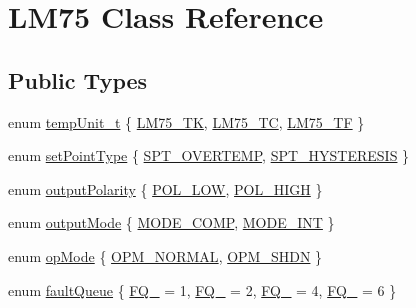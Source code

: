 \hypertarget{class_l_m75}{\section{L\-M75 Class Reference}
\label{class_l_m75}
}
\subsection*{Public Types}
\begin{DoxyCompactItemize}
\item 
enum \hyperlink{class_l_m75_a2a7ea6f324fe6d70e90dd76bac1d2f2d}{temp\-Unit\-\_\-t} \{ \hyperlink{class_l_m75_a2a7ea6f324fe6d70e90dd76bac1d2f2da547e55f7743275a163e43576c120477b}{L\-M75\-\_\-\-T\-K}, 
\hyperlink{class_l_m75_a2a7ea6f324fe6d70e90dd76bac1d2f2dac93d25e3d1bca073b3fb6c725de49ea1}{L\-M75\-\_\-\-T\-C}, 
\hyperlink{class_l_m75_a2a7ea6f324fe6d70e90dd76bac1d2f2da41c080b0ce5607f1767060ac24e4c522}{L\-M75\-\_\-\-T\-F}
 \}
\item 
enum \hyperlink{class_l_m75_ac49994df7bcf8aeda551af5b80559402}{set\-Point\-Type} \{ \hyperlink{class_l_m75_ac49994df7bcf8aeda551af5b80559402a230e9a69afffee2738e3364daff2c838}{S\-P\-T\-\_\-\-O\-V\-E\-R\-T\-E\-M\-P}, 
\hyperlink{class_l_m75_ac49994df7bcf8aeda551af5b80559402a0f0b37dce684d29af5fd1fbf7a78baa2}{S\-P\-T\-\_\-\-H\-Y\-S\-T\-E\-R\-E\-S\-I\-S}
 \}
\item 
enum \hyperlink{class_l_m75_a199325ea8f9a90a2150587371682fc44}{output\-Polarity} \{ \hyperlink{class_l_m75_a199325ea8f9a90a2150587371682fc44a6ab923b2ccbda503412114744a377cdc}{P\-O\-L\-\_\-\-L\-O\-W}, 
\hyperlink{class_l_m75_a199325ea8f9a90a2150587371682fc44a533db76668e7eaf3e7f50708f2e9ce43}{P\-O\-L\-\_\-\-H\-I\-G\-H}
 \}
\item 
enum \hyperlink{class_l_m75_a32d79ab5e1a4b80d9a52cb9d62b590e5}{output\-Mode} \{ \hyperlink{class_l_m75_a32d79ab5e1a4b80d9a52cb9d62b590e5a9fadb52968bde2b7e910a9453738f0a7}{M\-O\-D\-E\-\_\-\-C\-O\-M\-P}, 
\hyperlink{class_l_m75_a32d79ab5e1a4b80d9a52cb9d62b590e5ac4e4b9f082ff7a02bbee67a3f57a0b48}{M\-O\-D\-E\-\_\-\-I\-N\-T}
 \}
\item 
enum \hyperlink{class_l_m75_a6194e0c26b8fc717dade26a62070e976}{op\-Mode} \{ \hyperlink{class_l_m75_a6194e0c26b8fc717dade26a62070e976a6ea0dc0ebe95666ba6d122fa88bb9cf8}{O\-P\-M\-\_\-\-N\-O\-R\-M\-A\-L}, 
\hyperlink{class_l_m75_a6194e0c26b8fc717dade26a62070e976ab7194696d2b5b653f00d902c3b7c46b8}{O\-P\-M\-\_\-\-S\-H\-D\-N}
 \}
\item 
enum \hyperlink{class_l_m75_adc17def542ebe019d6ef064bdcb37f10}{fault\-Queue} \{ \hyperlink{class_l_m75_adc17def542ebe019d6ef064bdcb37f10ab097f0541ef6ffca709899a977e4d0ab}{F\-Q\-\_} = 1, 
\hyperlink{class_l_m75_adc17def542ebe019d6ef064bdcb37f10a6f1c5562402075a0adf5cd4fe4f73e41}{F\-Q\-\_} = 2, 
\hyperlink{class_l_m75_adc17def542ebe019d6ef064bdcb37f10a441964c9648220f4d1201a918ee3a57d}{F\-Q\-\_} = 4, 
\hyperlink{class_l_m75_adc17def542ebe019d6ef064bdcb37f10a65995a2615014d4805da07bdd2a70772}{F\-Q\-\_} = 6
 \}
\end{DoxyCompactItemize}
